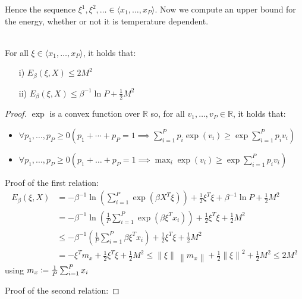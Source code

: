 \noindent Hence the sequence $\xi^1,\xi^2,\ldots\in\langle{x_1,\ldots,x_P}\rangle$. Now we compute an upper bound for the energy, whether or not it is temperature dependent.
\begin{lemma} \\
    For all $\xi\in\langle{x_1,\ldots,x_P}\rangle$, it holds that:
    \begin{itemize}[itemsep=2pt, topsep=10pt]
        \item[i)]
        $E_\beta\left(\xi,X\right)\leq2 M^2$
        \item[ii)] $E_\beta\left(\xi,X\right)\leq\beta^{-1}\ln P + \frac12 M^2$
    \end{itemize}
    \begin{proof}
        $\exp$ is a convex function over $\mathbb{R}$ so, for all $v_1,\ldots,v_P\in\mathbb{R}$, it holds that:
        \begin{itemize}[itemsep=2pt, topsep=10pt]
            \item $\forall{p_1,\ldots,p_P}\geq0\left(p_1+\cdots+p_P=1\implies\sum_{i=1}^{P}p_i\exp\left(v_i\right)\geq\exp\sum_{i=1}^{P}p_iv_i\right)$
            \item $\forall{p_1,\ldots,p_P}\geq0\left(p_1+\ldots+p_P=1\implies\max_i\exp\left(v_i\right)\geq\exp\sum_{i=1}^{P}p_iv_i\right)$
        \end{itemize}

        \noindent Proof of the first relation:
        \begin{align*}
            E_\beta\left(\xi,X\right) &= -\beta^{-1}\ln\left(\sum_{i=1}^{P}\exp\left(\beta X^T\xi\right)\right) + \frac12\xi^T\xi + \beta^{-1}\ln P + \frac12 M^2 \\
            &= -\beta^{-1}\ln\left(\frac{1}{P}\sum_{i=1}^{P}\exp\left(\beta\xi^Tx_i\right)\right)+\frac12\xi^T\xi+\frac12M^2 \\
            &\leq -\beta^{-1}\left(\frac{1}{P}\sum_{i=1}^{P}\beta\xi^Tx_i\right)+\frac12\xi^T\xi+\frac12M^2 \\
            &= -\xi^Tm_x + \frac12\xi^T\xi+\frac12M^2 \leq \left\|\xi\right\|\,\left\|m_x\right\| + \frac12\left\|\xi\right\|^2+\frac12M^2\leq2M^2
        \end{align*}
        using $m_x \coloneqq \frac{1}{P}\sum_{i=1}^{P}x_i $

        \noindent Proof of the second relation:


\end{proof}
\end{lemma}
